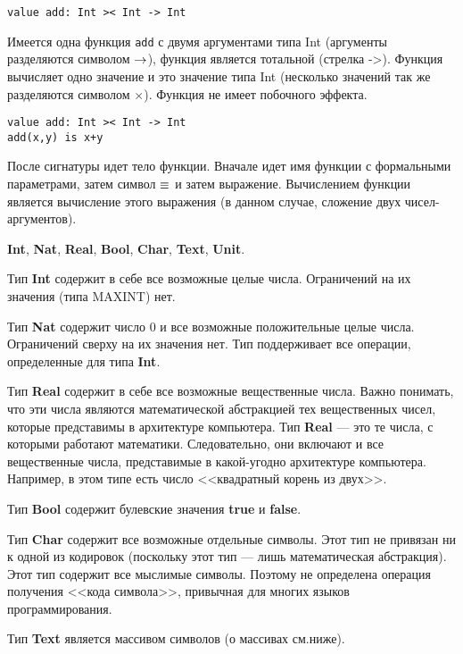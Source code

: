 

\begin{lstlisting}
value add: Int >< Int -> Int
\end{lstlisting}
Имеется одна функция \texttt{add} с двумя аргументами типа Int (аргументы разделяются символом $\rightarrow$), функция является тотальной (стрелка ->). Функция вычисляет одно значение и это значение типа Int (несколько значений так же разделяются символом $\times$). Функция не имеет побочного эффекта.

\begin{lstlisting}
value add: Int >< Int -> Int
add(x,y) is x+y
\end{lstlisting}
После сигнатуры идет тело функции. Вначале идет имя функции с формальными параметрами, затем символ $\mathop{\equiv}$ и затем выражение. Вычислением функции является вычисление этого выражения (в данном случае, сложение двух чисел-аргументов).

\textbf{Int}, \textbf{Nat}, \textbf{Real}, \textbf{Bool}, \textbf{Char}, \textbf{Text}, \textbf{Unit}.

Тип \textbf{Int} содержит в себе все возможные целые числа. Ограничений на их значения (типа MAXINT) нет.

Тип \textbf{Nat} содержит число 0 и все возможные положительные целые числа. Ограничений сверху на их значения нет. Тип поддерживает все операции, определенные для типа \textbf{Int}.

Тип \textbf{Real} содержит в себе все возможные вещественные числа. Важно понимать, что эти числа являются математической абстракцией тех вещественных чисел, которые представимы в архитектуре компьютера. Тип \textbf{Real} --- это те числа, с которыми работают математики. Следовательно, они включают и все вещественные числа, представимые в какой-угодно архитектуре компьютера. Например, в этом типе есть число <<квадратный корень из двух>>.

Тип \textbf{Bool} содержит булевские значения \textbf{true} и \textbf{false}.

Тип \textbf{Char} содержит все возможные отдельные символы. Этот тип не привязан ни к одной из кодировок (поскольку этот тип --- лишь математическая абстракция). Этот тип содержит все мыслимые символы. Поэтому не определена операция получения <<кода символа>>, привычная для многих языков программирования.

Тип \textbf{Text} является массивом символов (о массивах см.ниже).

